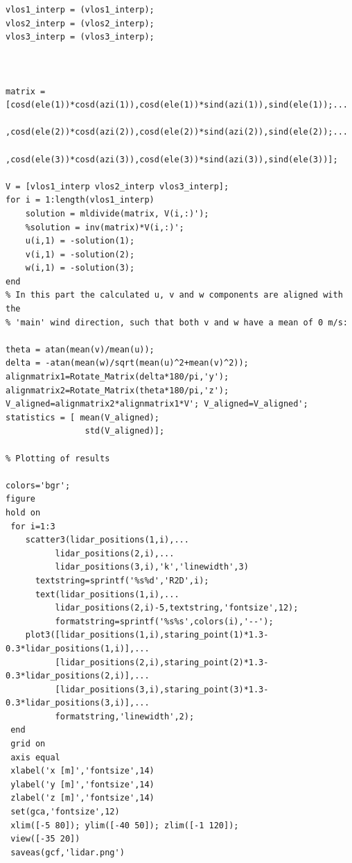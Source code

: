 \documentclass[10pt]{article}
\begin{document}
\begin{lstlisting}
vlos1_interp = (vlos1_interp);
vlos2_interp = (vlos2_interp);
vlos3_interp = (vlos3_interp);



matrix = [cosd(ele(1))*cosd(azi(1)),cosd(ele(1))*sind(azi(1)),sind(ele(1));...
            ,cosd(ele(2))*cosd(azi(2)),cosd(ele(2))*sind(azi(2)),sind(ele(2));...
            ,cosd(ele(3))*cosd(azi(3)),cosd(ele(3))*sind(azi(3)),sind(ele(3))];
        
V = [vlos1_interp vlos2_interp vlos3_interp];
for i = 1:length(vlos1_interp)
    solution = mldivide(matrix, V(i,:)');
    %solution = inv(matrix)*V(i,:)';
    u(i,1) = -solution(1);
    v(i,1) = -solution(2);
    w(i,1) = -solution(3);
end
% In this part the calculated u, v and w components are aligned with the
% 'main' wind direction, such that both v and w have a mean of 0 m/s:

theta = atan(mean(v)/mean(u));
delta = -atan(mean(w)/sqrt(mean(u)^2+mean(v)^2));
alignmatrix1=Rotate_Matrix(delta*180/pi,'y');
alignmatrix2=Rotate_Matrix(theta*180/pi,'z');
V_aligned=alignmatrix2*alignmatrix1*V'; V_aligned=V_aligned';
statistics = [ mean(V_aligned);
                std(V_aligned)];
            
% Plotting of results

colors='bgr';
figure
hold on
 for i=1:3
    scatter3(lidar_positions(1,i),...
          lidar_positions(2,i),...
          lidar_positions(3,i),'k','linewidth',3)
      textstring=sprintf('%s%d','R2D',i);
      text(lidar_positions(1,i),...
          lidar_positions(2,i)-5,textstring,'fontsize',12);
          formatstring=sprintf('%s%s',colors(i),'--');
    plot3([lidar_positions(1,i),staring_point(1)*1.3-0.3*lidar_positions(1,i)],...
          [lidar_positions(2,i),staring_point(2)*1.3-0.3*lidar_positions(2,i)],...
          [lidar_positions(3,i),staring_point(3)*1.3-0.3*lidar_positions(3,i)],...
          formatstring,'linewidth',2);
 end
 grid on
 axis equal
 xlabel('x [m]','fontsize',14)
 ylabel('y [m]','fontsize',14)
 zlabel('z [m]','fontsize',14)
 set(gca,'fontsize',12)
 xlim([-5 80]); ylim([-40 50]); zlim([-1 120]);
 view([-35 20])
 saveas(gcf,'lidar.png')
\end{lstlisting}
\end{document}
